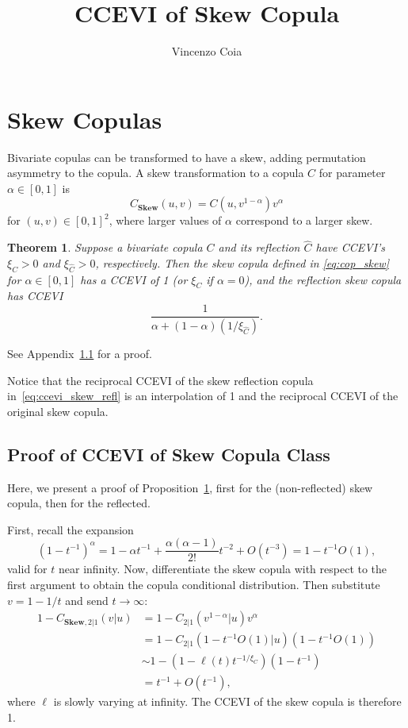 \documentclass{article}\usepackage[]{graphicx}\usepackage[]{color}
\title{CCEVI of Skew Copula}
\author{Vincenzo Coia}
\newtheorem{theorem}{Theorem}
\def\Chat{{\widehat C}}
\def\Sk{\mathrm{\textbf{Skew}}}
\def\a{\alpha}
\begin{document}
\maketitle

\section{Skew Copulas}
\label{sec:ccevi-skew}

Bivariate copulas can be transformed to have a skew, adding permutation asymmetry to the copula. 
A skew transformation to a copula $C$ for parameter $\alpha\in[0,1]$ is
\begin{equation}
\label{eq:cop_skew}
C_{\Sk}(u,v)=C(u,v^{1-\alpha})v^{\alpha}
\end{equation}
for $(u,v)\in[0,1]^2$, where larger values of $\alpha$ correspond to a larger skew.

\begin{theorem}
\label{prop:ccevi_skew}
Suppose a bivariate copula $C$ and its reflection $\Chat$ have CCEVI's $\xi_C>0$ and $\xi_{\Chat}>0$, respectively. Then the skew copula defined in \eqref{eq:cop_skew} for $\alpha\in[0,1]$ has a CCEVI of 1 (or $\xi_C$ if $\alpha=0$), and the reflection skew copula has CCEVI
\begin{equation}
\label{eq:ccevi_skew_refl}
\frac{1}{\a + (1-\a)(1/\xi_{\Chat})}.
\end{equation}
\end{theorem}

See Appendix~\ref{app:pfs-skew} for a proof.

Notice that the reciprocal CCEVI of the skew reflection copula in~\eqref{eq:ccevi_skew_refl} is an interpolation of 1 and the reciprocal CCEVI of the original skew copula.


\subsection{Proof of CCEVI of Skew Copula Class}
\label{app:pfs-skew}

Here, we present a proof of Proposition~\ref{prop:ccevi_skew}, first for the (non-reflected) skew copula, then for the reflected. 

First, recall the expansion
\begin{equation}
(1-t^{-1})^{\a} 
    = 1 - \a t^{-1} + \frac{\a(\a-1)}{2!}t^{-2} + O(t^{-3})
    = 1 - t^{-1}O(1),
\end{equation}
valid for $t$ near infinity.
Now, differentiate the skew copula with respect to the first argument to obtain the copula conditional distribution. Then substitute $v=1-1/t$ and send $t\rightarrow\infty$:
\begin{align}
1 - C_{\Sk, 2|1}(v|u) 
    &=    1 - C_{2|1}(v^{1-\a} | u) v^{\a} \\
    &=    1 - C_{2|1}(1-t^{-1}O(1)|u)
                       (1-t^{-1}O(1)) \\
    &\sim 1 - (1 - \ell(t)t^{-1/\xi_C})(1-t^{-1}) \\
    &=    t^{-1} + O(t^{-1}),
\end{align}
where $\ell$ is slowly varying at infinity. 
The CCEVI of the skew copula is therefore 1.
\end{document}
